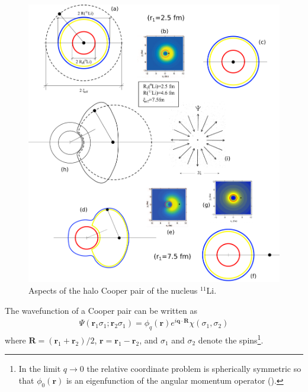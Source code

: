   \begin{figure}
  	\centerline{\includegraphics*[width=15cm,angle=0	]{nutshell/figs/Fig3B1}}
  	\caption{Aspects of the halo Cooper pair of the nucleus $^{11}$Li.}\label{fig3B1}
  \end{figure}
The wavefunction of a Cooper pair  can be written as
\begin{align}\label{eq3B1}
\Psi(\mathbf r_1\sigma_1;\mathbf r_2\sigma_1)=\phi_q(\mathbf r)e^{i\mathbf q\cdot\mathbf R}\chi(\sigma_1,\sigma_2)
\end{align}
where $\mathbf R=(\mathbf r_1+\mathbf r_2)/2$, $\mathbf r=\mathbf r_1-\mathbf r_2$, and $\sigma_1$ and $\sigma_2$ denote the spins\footnote{In the limit $q\rightarrow 0$ the relative coordinate problem is spherically symmetric so that $\phi_0(\mathbf r)$ is an eigenfunction of the angular momentum operator (\cite{Schrieffer:64}).}. 


